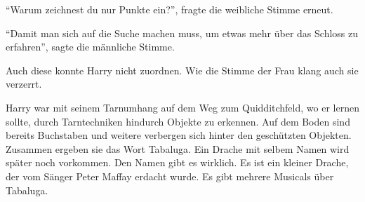 \enquote{Warum zeichnest du nur Punkte ein?}, fragte die weibliche Stimme erneut.

\enquote{Damit man sich auf die Suche machen muss, um etwas mehr über das Schloss zu erfahren}, sagte die männliche Stimme.

Auch diese konnte Harry nicht zuordnen. Wie die Stimme der Frau klang auch sie verzerrt.




\begin{kommentar}
Harry war mit seinem Tarnumhang auf dem Weg zum Quidditchfeld, wo er lernen sollte, durch Tarntechniken hindurch Objekte zu erkennen. Auf dem Boden sind bereits Buchstaben und weitere verbergen sich hinter den geschützten Objekten. Zusammen ergeben sie das Wort Tabaluga. Ein Drache mit selbem Namen wird später noch vorkommen. Den Namen gibt es wirklich. Es ist ein kleiner Drache, der vom Sänger Peter Maffay erdacht wurde. Es gibt mehrere Musicals über Tabaluga.
\end{kommentar}
